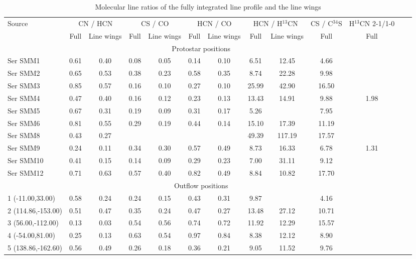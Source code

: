 \documentclass{aa}
\begin{document}
\begin{table*} \caption{Molecular line ratios of the fully integrated line profile and the line wings}             %
\label{table:CN/HCN}
\centering     
   \begin{tabular}{l c c c c c c c c c c c c } 
   \hline\hline 
Source & \multicolumn{2}{c}{CN / HCN} & \multicolumn{2}{c}{CS / CO} & \multicolumn{2}{c}{HCN / CO} & \multicolumn{2}{c}{HCN / H$^{13}$CN} & CS / C$^{34}$S & H$^{13}$CN 2-1/1-0\\
~ & Full & Line wings & Full & Line wings & Full & Line wings & Full & Line wings & Full & Full \\
\hline 
\multicolumn{11}{c}{Protostar positions} \\
\hline 
Ser SMM1 & 0.61 & 0.40 & 0.08 & 0.05 & 0.14 & 0.10 & 6.51 & 12.45 & 4.66 &     \\
Ser SMM2 & 0.65 & 0.53 & 0.38 & 0.23 & 0.58 & 0.35 & 8.74 & 22.28 & 9.98 &    \\
Ser SMM3 & 0.85 & 0.57 & 0.16 & 0.10 & 0.27 & 0.10 & 25.99 & 42.90 & 16.50 &    \\
Ser SMM4 & 0.47 & 0.40 & 0.16 & 0.12 & 0.23 & 0.13 & 13.43 & 14.91 & 9.88 & 1.98  \\
Ser SMM5 & 0.67 & 0.31 & 0.19 & 0.09 & 0.31 & 0.17 & 5.26 &  & 7.95 &   \\
Ser SMM6 & 0.81 & 0.55 & 0.29 & 0.19 & 0.44 & 0.14 & 15.10 & 17.39 & 11.19 &   \\
Ser SMM8 & 0.43 & 0.27 &  &  &  &  & 49.39 & 117.19 & 17.57 &   \\
Ser SMM9 & 0.24 & 0.11 & 0.34 & 0.30 & 0.57 & 0.49 & 8.73 & 16.33 & 6.78 & 1.31  \\
Ser SMM10 & 0.41 & 0.15 & 0.14 & 0.09 & 0.29 & 0.23 & 7.00 & 31.11 & 9.12 &   \\
Ser SMM12 & 0.71 & 0.63 & 0.57 & 0.40 & 0.82 & 0.49 & 8.84 & 10.82 & 17.70 &   \\
\hline 
\multicolumn{11}{c}{Outflow positions} \\
\hline 
1 (-11.00,33.00) & 0.58 & 0.24 & 0.24 & 0.15 & 0.43 & 0.31 & 9.87 &  & 4.16 &   \\
2 (114.86,-153.00) & 0.51 & 0.47 & 0.35 & 0.24 & 0.47 & 0.27 & 13.48 & 27.12 & 10.71 &   \\
3 (56.00,-112.00) & 0.13 & 0.03 & 0.54 & 0.56 & 0.74 & 0.72 & 11.92 & 12.29 & 15.57 &   \\
4 (-54.00,81.00) & 0.25 & 0.13 & 0.63 & 0.54 & 0.97 & 0.84 & 8.38 & 12.12 & 8.90 &   \\
5 (138.86,-162.60) & 0.56 & 0.49 & 0.26 & 0.18 & 0.36 & 0.21 & 9.05 & 11.52 & 9.76 &  \\ 

\end{tabular}
\end{table*}
\end{document}
